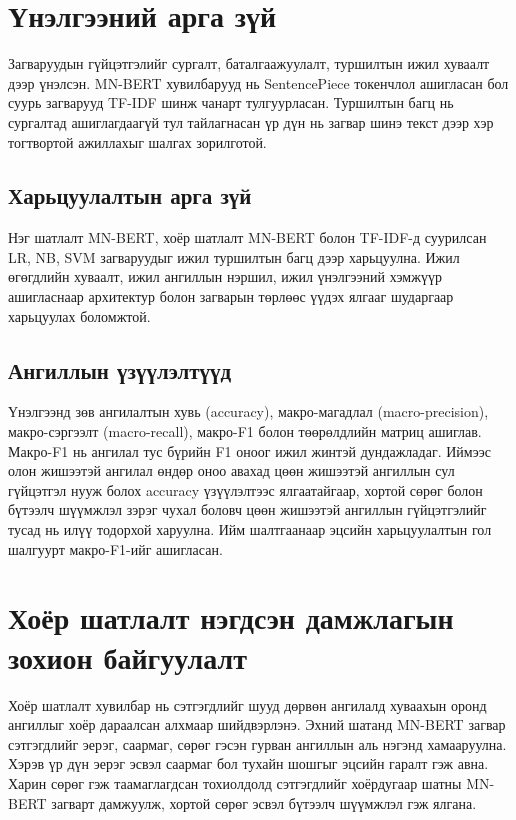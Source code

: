 \section{Үнэлгээний арга зүй}

Загваруудын гүйцэтгэлийг сургалт, баталгаажуулалт, туршилтын ижил хуваалт дээр
үнэлсэн. MN-BERT хувилбарууд нь SentencePiece токенчлол ашигласан бол суурь
загварууд TF-IDF шинж чанарт тулгуурласан. Туршилтын багц нь сургалтад
ашиглагдаагүй тул тайлагнасан үр дүн нь загвар шинэ текст дээр хэр тогтвортой
ажиллахыг шалгах зорилготой.

\subsection{Харьцуулалтын арга зүй}

Нэг шатлалт MN-BERT, хоёр шатлалт MN-BERT болон TF-IDF-д суурилсан LR, NB, SVM
загваруудыг ижил туршилтын багц дээр харьцуулна. Ижил өгөгдлийн хуваалт,
ижил ангиллын нэршил, ижил үнэлгээний хэмжүүр ашигласнаар архитектур болон
загварын төрлөөс үүдэх ялгааг шударгаар харьцуулах боломжтой.

\subsection{Ангиллын үзүүлэлтүүд}
\label{sec:eval-metrics}

Үнэлгээнд зөв ангилалтын хувь (accuracy), макро-магадлал (macro-precision),
макро-сэргээлт (macro-recall), макро-F1 болон төөрөлдлийн матриц
ашиглав. Макро-F1 нь ангилал тус бүрийн F1 оноог ижил
жинтэй дундажладаг. Иймээс
олон жишээтэй ангилал өндөр оноо авахад цөөн жишээтэй ангиллын сул гүйцэтгэл
нууж болох accuracy үзүүлэлтээс ялгаатайгаар, хортой сөрөг болон бүтээлч
шүүмжлэл зэрэг чухал боловч цөөн жишээтэй ангиллын гүйцэтгэлийг тусад нь
илүү тодорхой харуулна. Ийм шалтгаанаар эцсийн харьцуулалтын гол шалгуурт
макро-F1-ийг ашигласан.

\section{Хоёр шатлалт нэгдсэн дамжлагын зохион байгуулалт}
\label{sec:two-stage-architecture}

Хоёр шатлалт хувилбар нь сэтгэгдлийг шууд дөрвөн ангилалд хуваахын оронд
ангиллыг хоёр дараалсан алхмаар шийдвэрлэнэ. Эхний шатанд MN-BERT загвар
сэтгэгдлийг эерэг, саармаг, сөрөг гэсэн гурван ангиллын аль нэгэнд хамааруулна.
Хэрэв үр дүн эерэг эсвэл саармаг бол тухайн шошгыг эцсийн гаралт гэж авна.
Харин сөрөг гэж таамаглагдсан тохиолдолд сэтгэгдлийг хоёрдугаар шатны
MN-BERT загварт дамжуулж, хортой сөрөг эсвэл бүтээлч шүүмжлэл гэж ялгана.

